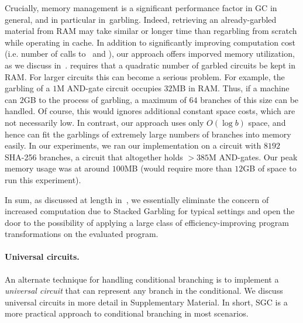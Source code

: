 Crucially, memory management is a significant performance factor in GC
in general, and in particular in~\HK garbling.  Indeed, retrieving an
already-garbled material from RAM may take similar or longer time than
regarbling from scratch while operating in cache.
In addition to significantly improving computation cost (i.e. number
of calls to \Gb\ and \Ev), our approach offers imporved
memory utilization, as we discuss in~.
\HK requires that a quadratic number of
garbled circuits be kept in RAM.  For larger circuits this can become
a serious problem.
For example, the garbling of a $1$M AND-gate circuit
occupies $32$MB in RAM.
Thus, if a machine can $2$GB to the process of garbling, a maximum of
$64$ branches of this size can be handled. Of course, this would
ignores additional constant space costs, which are not necessarily
low.
%
In contrast, our approach uses only $O(\log b)$ space, and hence can
fit the garblings of extremely large numbers of branches into memory
easily.
In our experiments, we ran our implementation on a circuit with $8192$
SHA-256 branches, a circuit that altogether holds $> 385$M AND-gates.
Our peak memory usage was at around $100$MB (\HK would require more
than $12$GB of space to run this experiment).



In sum, as discussed at length
in~, we
essentially eliminate the concern of increased computation due to
Stacked Garbling for typical settings 
and open the door to the possibility of applying a large class of
efficiency-improving program transformations on the evaluated program.


\paragraph{Universal circuits.}
An alternate technique for handling conditional branching is to
implement a \emph{universal circuit} that can represent any branch in
the conditional.
We discuss universal circuits in more detail in Supplementary Material.
In short, SGC is a more practical approach to conditional branching in
most scenarios.

